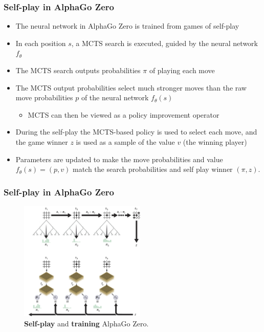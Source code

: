\documentclass[9pt]{beamer}
\begin{document}
\begin{frame}
	\frametitle{Self-play in AlphaGo Zero}
	
	\begin{itemize}
		\item The neural network in AlphaGo Zero is trained from games of self-play
		\item In each position $s$, a MCTS search is executed, guided by the neural network $f_\theta$
		\item The MCTS search outputs probabilities $\pi$ of playing each move
		\item The MCTS output probabilities select much stronger moves than the raw move probabilities $p$ of the neural network $f_\theta(s)$
		\begin{itemize}
			\item MCTS can then be viewed as a policy improvement operator
		\end{itemize}
		\item During the self-play the MCTS-based policy is used to select each move, and the game winner $z$ is used as a sample of the value $v$ (the winning player)
		\item Parameters are updated to make the move probabilities and value $f_\theta(s) = (p, v) $ match the search probabilities and self play winner $(\pi, z)$.
	\end{itemize}
\end{frame}


\begin{frame}
	\frametitle{Self-play in AlphaGo Zero}
		
	\begin{figure}[H]
		\centering
		\includegraphics[width=6cm]{alpha_go_zero_training.png}
		
		\caption{
			\textbf{Self-play} and \textbf{training} AlphaGo Zero.\cite{Silver_2016}
			}
		\label{fig:alpha-zero-self_play}
	\end{figure}
\end{frame}
\end{document}
